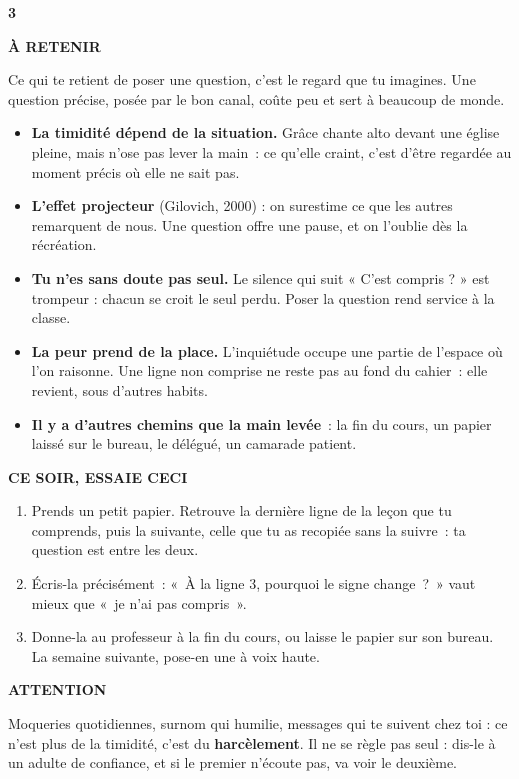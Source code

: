 \documentclass[10pt,twoside,openany]{book}
\newenvironment{aretenir}[1][À retenir]{\par\begin{tcolorbox}[enhanced,colback=creme,colframe=accent,boxrule=0pt,leftrule=3pt,arc=0pt,left=8pt,right=8pt,top=5pt,bottom=5pt,breakable]{\small\bfseries\color{accent}\MakeUppercase{#1}}\par\smallskip}{\end{tcolorbox}\par}
\newenvironment{cesoir}[1][Ce soir, essaie ceci]{\par\begin{tcolorbox}[enhanced,colback=white,colframe=vert,boxrule=0.6pt,arc=2pt,left=8pt,right=8pt,top=5pt,bottom=5pt,breakable]{\small\bfseries\color{vert}\MakeUppercase{#1}}\par\smallskip\small}{\end{tcolorbox}\par}
\newenvironment{prudence}[1][Ce que dit la recherche]{\par\begin{tcolorbox}[enhanced,colback=black!4,colframe=bleu,boxrule=0pt,leftrule=3pt,arc=0pt,left=8pt,right=8pt,top=5pt,bottom=5pt,breakable]{\small\bfseries\color{bleu}\MakeUppercase{#1}}\par\smallskip\small}{\end{tcolorbox}\par}
\newcommand{\fiche}[3]{\clearpage\markright{#2}\thispagestyle{plain}%
 {\noindent\color{accent}\fontsize{40}{40}\selectfont\bfseries #1}\hspace{0.6em}{\Large\bfseries #2\par}\vspace{0.1em}{\small\color{gris}\itshape #3\par}\vspace{0.5em}}
\begin{document}
\fiche{3}{La main}{Chapitre 3 du livre}
\begin{aretenir}
Ce qui te retient de poser une question, c’est le regard que tu imagines. Une question précise, posée par le bon canal, coûte peu et sert à beaucoup de monde.
\end{aretenir}
\begin{itemize}
\item \textbf{La timidité dépend de la situation.} Grâce chante alto devant une église pleine, mais n’ose pas lever la main : ce qu’elle craint, c’est d’être regardée au moment précis où elle ne sait pas.
\item \textbf{L’effet projecteur} (Gilovich, 2000) : on surestime ce que les autres remarquent de nous. Une question offre une pause, et on l’oublie dès la récréation.
\item \textbf{Tu n’es sans doute pas seul.} Le silence qui suit « C’est compris ? » est trompeur : chacun se croit le seul perdu. Poser la question rend service à la classe.
\item \textbf{La peur prend de la place.} L’inquiétude occupe une partie de l’espace où l’on raisonne. Une ligne non comprise ne reste pas au fond du cahier : elle revient, sous d’autres habits.
\item \textbf{Il y a d’autres chemins que la main levée} : la fin du cours, un papier laissé sur le bureau, le délégué, un camarade patient.
\end{itemize}
\begin{cesoir}
\begin{enumerate}
\item Prends un petit papier. Retrouve la dernière ligne de la leçon que tu comprends, puis la suivante, celle que tu as recopiée sans la suivre : ta question est entre les deux.
\item Écris-la précisément : « À la ligne 3, pourquoi le signe change ? » vaut mieux que « je n’ai pas compris ».
\item Donne-la au professeur à la fin du cours, ou laisse le papier sur son bureau. La semaine suivante, pose-en une à voix haute.
\end{enumerate}
\end{cesoir}
\begin{prudence}[Attention]
Moqueries quotidiennes, surnom qui humilie, messages qui te suivent chez toi : ce n’est plus de la timidité, c’est du \textbf{harcèlement}. Il ne se règle pas seul : dis-le à un adulte de confiance, et si le premier n’écoute pas, va voir le deuxième.
\end{prudence}
\end{document}
